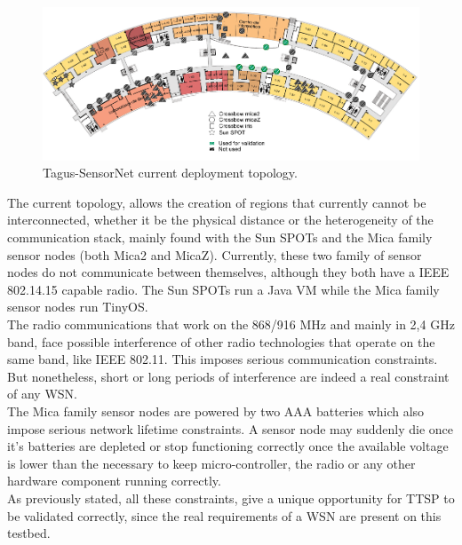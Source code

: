 \begin{figure}[!htb]
\begin{center}
\includegraphics[scale=0.4]{./images/04-tsn-topology.png}
\end{center}
\caption{Tagus-SensorNet current deployment topology.}
\label{tsn}
\end{figure}
The current topology, allows the creation of regions that currently cannot be interconnected, whether it be the physical distance or the heterogeneity of the communication stack, mainly found with the Sun SPOTs and the  Mica family sensor nodes (both Mica2 and MicaZ). Currently, these two family of sensor nodes do not communicate between themselves, although they both have a IEEE 802.14.15 capable radio. The Sun SPOTs run a Java VM while the Mica family sensor nodes run TinyOS.\\
The radio communications that work on the 868/916 MHz and mainly in 2,4 GHz band, face possible interference of other radio technologies that operate on the same band, like IEEE 802.11. This imposes serious communication constraints. But nonetheless, short or long periods of interference are indeed a real
constraint of any WSN.\\
The Mica family sensor nodes are powered by two AAA batteries which also impose serious network lifetime constraints. A sensor node may suddenly die once it's batteries are depleted or stop functioning correctly once the available voltage is lower than the necessary to keep micro-controller, the radio or any other hardware component running correctly.\\
As previously stated, all these constraints, give a unique opportunity for TTSP to be validated correctly, since the real requirements of a WSN are present on this testbed.


